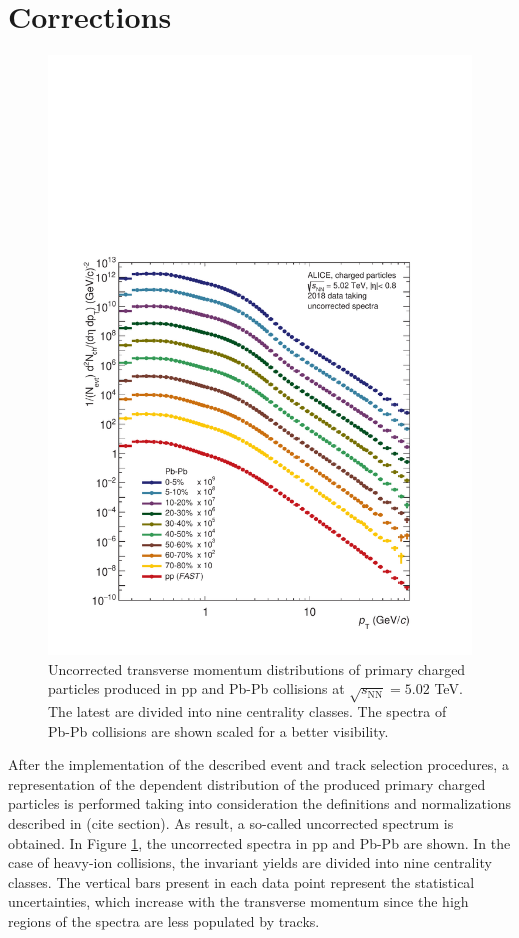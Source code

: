 \documentclass[12pt,a4paper]{report}
\begin{document}
\section{Corrections}
\begin{figure}[tb!]
\centering
\includegraphics[width=12cm]{Plots/uncorrectedSpectra.pdf}  
\caption{Uncorrected transverse momentum distributions of primary charged particles produced in pp and Pb-Pb collisions at $\sqrt{s_\text{NN}} = 5.02$ TeV. The latest are divided into nine centrality classes. The \pt spectra of Pb-Pb collisions are shown scaled for a better visibility. }
\label{uncorrSpec}
\end{figure}
After the implementation of the described event and track selection procedures, a representation of the \pt dependent distribution of the produced primary charged particles is performed taking into consideration the definitions and normalizations described in (cite section). As result, a so-called uncorrected \pt spectrum is obtained. In Figure \ref{uncorrSpec}, the uncorrected \pt spectra in pp and Pb-Pb are shown. In the case of heavy-ion collisions, the invariant yields are divided into nine centrality classes. The vertical bars present in each data point represent the statistical uncertainties, which increase with the transverse momentum since the high \pt regions of the spectra are less populated by tracks.  \\
\end{document}
